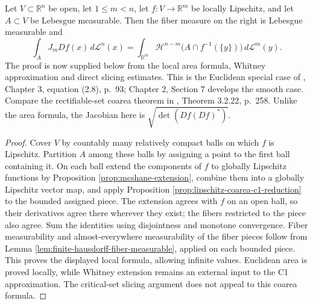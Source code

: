 \begin{theorem}\label{thm:coarea-formula}
Let $V\subset\mathbb{R}^n$ be open, let $1\leq m<n$, let $f:V\to\mathbb{R}^m$ be locally Lipschitz, and let $A\subset V$ be Lebesgue measurable. Then the fiber measure on the right is Lebesgue measurable and
\[
 \int_A J_mDf(x)\,d\mathcal{L}^n(x)
 =\int_{\mathbb{R}^m}\mathcal{H}^{n-m}\bigl(A\cap f^{-1}(\{y\})\bigr)\,d\mathcal{L}^m(y).
\]
The proof is now supplied below from the local area formula, Whitney approximation and direct slicing estimates. This is the Euclidean special case of \cite{Sim18}, Chapter 3, equation (2.8), p.~93; Chapter 2, Section 7 develops the smooth case. Compare the rectifiable-set coarea theorem in \cite{Fed69}, Theorem 3.2.22, p.~258. Unlike the area formula, the Jacobian here is $\sqrt{\det(Df(Df)^*)}$.
\end{theorem}
\begin{proof}
Cover $V$ by countably many relatively compact balls on which $f$ is Lipschitz. Partition $A$ among these balls by assigning a point to the first ball containing it. On each ball extend the components of $f$ to globally Lipschitz functions by Proposition \ref{prop:mcshane-extension}, combine them into a globally Lipschitz vector map, and apply Proposition \ref{prop:lipschitz-coarea-c1-reduction} to the bounded assigned piece. The extension agrees with $f$ on an open ball, so their derivatives agree there wherever they exist; the fibers restricted to the piece also agree. Sum the identities using disjointness and monotone convergence. Fiber measurability and almost-everywhere measurability of the fiber pieces follow from Lemma \ref{lem:finite-hausdorff-fiber-measurable}, applied on each bounded piece. This proves the displayed local formula, allowing infinite values. Euclidean area is proved locally, while Whitney extension remains an external input to the C1 approximation. The critical-set slicing argument does not appeal to this coarea formula.
\end{proof}
